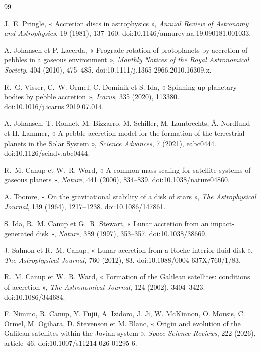 \documentclass[11pt,a4paper,openany]{report}
\begin{document}
\clearpage
{}
{}
\begin{thebibliography}{99}
\small

 J.~E. Pringle, « Accretion discs in astrophysics », \emph{Annual Review of
Astronomy and Astrophysics}, 19 (1981), 137--160. doi:10.1146/annurev.aa.19.090181.001033.

 A. Johansen et P. Lacerda, « Prograde rotation of protoplanets by
accretion of pebbles in a gaseous environment », \emph{Monthly Notices of the Royal Astronomical
Society}, 404 (2010), 475--485. doi:10.1111/j.1365-2966.2010.16309.x.

 R.~G. Visser, C.~W. Ormel, C. Dominik et S. Ida, « Spinning up planetary
bodies by pebble accretion », \emph{Icarus}, 335 (2020), 113380. doi:10.1016/j.icarus.2019.07.014.

 A. Johansen, T. Ronnet, M. Bizzarro, M. Schiller, M. Lambrechts,
Å. Nordlund et H. Lammer, « A pebble accretion model for the formation of the terrestrial planets
in the Solar System », \emph{Science Advances}, 7 (2021), eabc0444. doi:10.1126/sciadv.abc0444.

 R.~M. Canup et W.~R. Ward, « A common mass scaling for satellite systems
of gaseous planets », \emph{Nature}, 441 (2006), 834--839. doi:10.1038/nature04860.

 A. Toomre, « On the gravitational stability of a disk of stars »,
\emph{The Astrophysical Journal}, 139 (1964), 1217--1238. doi:10.1086/147861.

 S. Ida, R.~M. Canup et G.~R. Stewart, « Lunar accretion from an impact-generated
disk », \emph{Nature}, 389 (1997), 353--357. doi:10.1038/38669.

 J. Salmon et R.~M. Canup, « Lunar accretion from a Roche-interior fluid
disk », \emph{The Astrophysical Journal}, 760 (2012), 83. doi:10.1088/0004-637X/760/1/83.

 R.~M. Canup et W.~R. Ward, « Formation of the Galilean satellites:
conditions of accretion », \emph{The Astronomical Journal}, 124 (2002), 3404--3423.
doi:10.1086/344684.

 F. Nimmo, R. Canup, Y. Fujii, A. Izidoro, J. Ji, W. McKinnon, O. Mousis,
C. Ormel, M. Ogihara, D. Stevenson et M. Blanc, « Origin and evolution of the Galilean satellites
within the Jovian system », \emph{Space Science Reviews}, 222 (2026), article~46.
doi:10.1007/s11214-026-01295-6.


\end{thebibliography}
\end{document}
